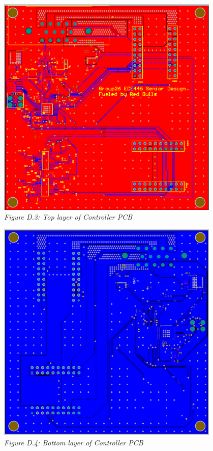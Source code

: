 \begin{center}
    \includegraphics[width=0.8\textwidth]{images/controller_pcb_top.png}\\
    \it Figure D.3: Top layer of Controller PCB\\
    \vspace{\baselineskip}

    \includegraphics[width=0.8\textwidth]{images/controller_pcb_bottom.png}\\
    \it Figure D.4: Bottom layer of Controller PCB\\
\end{center}

